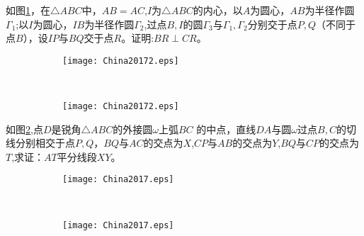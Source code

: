 \documentclass{article}
\begin{document}
\begin{Exercise}[title = {2017年A卷，40分}]
如图\ref{fig:China20172}，在$\triangle ABC$中，$AB=AC$,$I$为$\triangle ABC$的内心，以$A$为圆心，$AB$为半径作圆$\Gamma_1$;以$I$为圆心，$IB$为半径作圆$\Gamma_2$,过点$B,I$的圆$\Gamma_3$与$\Gamma_1,\Gamma_2$分别交于点$P,Q$（不同于点$B$），设$IP$与$BQ$交于点$R$。证明:$BR\perp CR$。
\end{Exercise}

\begin{figure}[!ht]
\centering
\begin{subfigure}[b]{0.45\textwidth}
	\texttt{[image: China20172.eps]}
	\caption{}\label{fig:China20172}
\end{subfigure}~
\begin{subfigure}[b]{0.45\textwidth}
	\texttt{[image: China20172.eps]}
	\caption{}
\end{subfigure}
\caption{}
\end{figure}
   

\begin{Exercise}[title = {2017年B卷，50分}]
如图\ref{fig:China2017},点$D$是锐角$\triangle ABC$的外接圆$\omega$上弧$BC$
的中点，直线$DA$与圆$\omega$过点$B,C$的切线分别相交于点$P,Q$，$BQ$与$AC$的交点为$X$,$CP$与$AB$的交点为$Y$,$BQ$与$CP$的交点为$T$,求证：$AT$平分线段$XY$。
\end{Exercise}

\begin{figure}[!ht]
\centering
\begin{subfigure}[b]{0.45\textwidth}
	\texttt{[image: China2017.eps]}
	\caption{}\label{fig:China2017}
\end{subfigure}~
\begin{subfigure}[b]{0.45\textwidth}
	\texttt{[image: China2017.eps]}
	\caption{}
\end{subfigure}
\caption{}
\end{figure}
\end{document}
